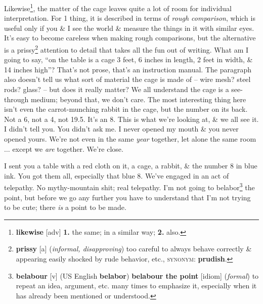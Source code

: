 \documentclass[oneside]{book}
\numberwithin{equation}{section}
\begin{document}
Likewise\footnote{\textbf{likewise} [adv] \textbf{1.} the same; in a similar way; \textbf{2.} also.}, the matter of the cage leaves quite a lot of room for individual interpretation. For 1 thing, it is described in terms of \textit{rough comparison}, which is useful only if you \& I see the world \& measure the things in it with similar eyes. It's easy to become careless when making rough comparisons, but the alternative is a prissy\footnote{\textbf{prissy} [a] (\textit{informal, disapproving}) too careful to always behave correctly \& appearing easily shocked by rude behavior, etc., \textsc{synonym}: \textbf{prudish}.} attention to detail that takes all the fun out of writing. What am I going to say, ``on the table is a cage 3 feet, 6 inches in length, 2 feet in width, \& 14 inches high''? That's not prose, that's an instruction manual. The paragraph also doesn't tell us what sort of material the cage is made of -- wire mesh? steel rods? glass? -- but does it really matter? We all understand the cage is a see-through medium; beyond that, we don't care. The most interesting thing here isn't even the carrot-munching rabbit in the cage, but the number on its back. Not a 6, not a 4, not 19.5. It's an 8. This is what we're looking at, \& we all see it. I didn't tell you. You didn't ask me. I never opened my mouth \& you never opened yours. We're not even in the same \textit{year} together, let alone the same room $\ldots$ except we \textit{are} together. We're close.


I sent you a table with a red cloth on it, a cage, a rabbit, \& the number 8 in blue ink. You got them all, especially that blue 8. We've engaged in an act of telepathy. No mythy-mountain shit; real telepathy. I'm not going to belabor\footnote{\textbf{belabour} [v] (US English \textbf{belabor}) \textbf{belabour the point} [idiom] (\textit{formal}) to repeat an idea, argument, etc. many times to emphasize it, especially when it has already been mentioned or understood.} the point, but before we go any further you have to understand that I'm not trying to be cute; there \textit{is} a point to be made.
\end{document}
